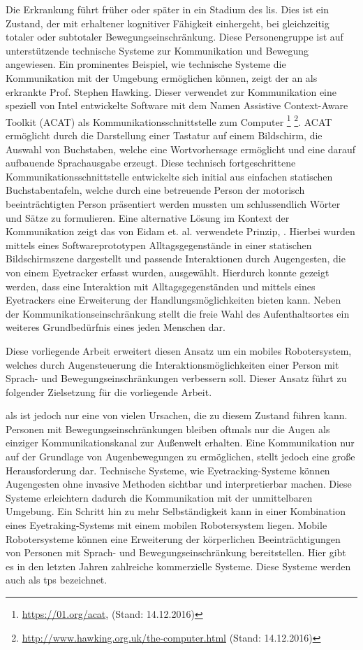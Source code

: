 Die Erkrankung führt früher oder später in ein Stadium des \acf{lis}. Dies ist ein Zustand, der mit erhaltener kognitiver Fähigkeit einhergeht, bei gleichzeitig totaler oder subtotaler Bewegungseinschränkung. Diese Personengruppe ist auf unterstützende technische Systeme zur Kommunikation und Bewegung angewiesen.
Ein prominentes Beispiel, wie technische Systeme die Kommunikation mit der Umgebung ermöglichen können, zeigt der an \acs{als} erkrankte Prof. Stephen Hawking. Dieser verwendet zur Kommunikation eine speziell von Intel entwickelte Software mit dem Namen Assistive Context-Aware Toolkit (ACAT) als Kommunikationsschnittstelle zum Computer \footnote{\url{https://01.org/acat}, (Stand: 14.12.2016)} 
\footnote{\url{http://www.hawking.org.uk/the-computer.html} (Stand: 14.12.2016)}. ACAT ermöglicht durch die Darstellung einer Tastatur auf einem Bildschirm, die Auswahl von Buchstaben, welche eine Wortvorhersage ermöglicht und eine darauf aufbauende Sprachausgabe erzeugt. Diese technisch fortgeschrittene Kommunikationsschnittstelle entwickelte sich initial aus einfachen statischen Buchstabentafeln, welche durch eine betreuende Person der motorisch beeinträchtigten Person präsentiert werden mussten um schlussendlich Wörter und Sätze zu formulieren. Eine alternative Lösung im Kontext der Kommunikation zeigt das  von Eidam et. al. verwendete Prinzip, \vgl \cite{Eidam2016}. Hierbei wurden mittels eines Softwareprototypen Alltagsgegenstände in einer statischen Bildschirmszene dargestellt und passende Interaktionen durch Augengesten, die von einem Eyetracker erfasst wurden, ausgewählt. Hierdurch konnte gezeigt werden, dass eine Interaktion mit Alltagsgegenständen und mittels eines Eyetrackers eine Erweiterung der Handlungsmöglichkeiten bieten kann. Neben der Kommunikationseinschränkung stellt die freie Wahl des Aufenthaltsortes ein weiteres Grundbedürfnis eines jeden Menschen dar. 


Diese vorliegende Arbeit erweitert diesen Ansatz um ein mobiles Robotersystem, welches durch Augensteuerung die Interaktionsmöglichkeiten einer Person mit Sprach- und Bewegungseinschränkungen verbessern soll. Dieser Ansatz führt zu folgender Zielsetzung für die vorliegende Arbeit. 

 \acs{als} ist jedoch nur eine von vielen Ursachen, die zu diesem Zustand führen kann. Personen mit Bewegungseinschränkungen bleiben oftmals nur die Augen als einziger Kommunikationskanal zur Außenwelt erhalten. Eine Kommunikation nur auf der Grundlage von Augenbewegungen zu ermöglichen, stellt jedoch eine große Herausforderung dar. Technische Systeme, wie Eyetracking-Systeme können Augengesten ohne invasive Methoden sichtbar und interpretierbar machen. Diese Systeme erleichtern dadurch die Kommunikation mit der unmittelbaren Umgebung. Ein Schritt hin zu mehr Selbständigkeit kann in einer Kombination eines Eyetraking-Systems mit einem mobilen Robotersystem liegen. 
Mobile Robotersysteme können eine Erweiterung der körperlichen Beeinträchtigungen von Personen mit Sprach- und Bewegungseinschränkung bereitstellen. Hier gibt es in den letzten Jahren zahlreiche kommerzielle Systeme.  Diese Systeme werden auch als \acf{tps} bezeichnet. 

